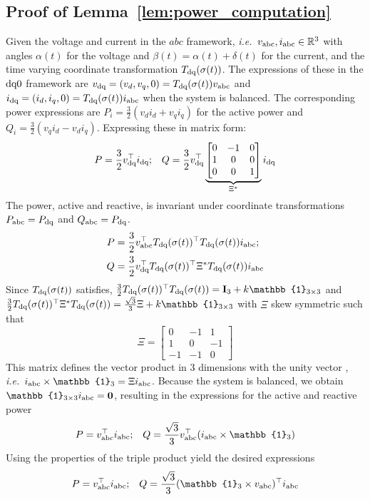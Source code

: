 \documentclass[journal, final, letterpaper]{IEEEtran}
\newcommand{\ts}[1]{{\textnormal{#1}}}
\newcommand{\ie}{\emph{i.e.}\ }
\newcommand{\Rset}{\mathbb{R}}
\newcommand{\mb}{\mathbf}
\newcommand{\mbb}{\mathbb}
\begin{document}
\subsection{Proof of Lemma~\ref{lem:power_computation}}
\label{sec:proof1}
%
%
Given the voltage and current in the $abc$ framework, \ie $v_\ts{abc},i_\ts{abc}\in\Rset^3$ with angles $\alpha(t)$ for the voltage and $\beta(t) = \alpha(t) + \delta(t)$ for the current, and the time varying coordinate transformation $T_\ts{dq}(\sigma(t))$. The expressions of these in the $\ts{dq0}$ framework are $v_\ts{dq} = (v_d,v_q,0) = T_\ts{dq}(\sigma(t))v_\ts{abc}$ and $i_\ts{dq} = (i_d,i_q,0)=T_\ts{dq}(\sigma(t))i_\ts{abc}$ when the system is balanced. The corresponding power expressions are $P_i = \frac{3}{2}(v_di_d + v_qi_q)$ for the active power and $Q_i = \frac{3}{2}(v_qi_d - v_di_q)$. Expressing these in matrix form:
%
\begin{align*}
	P = \frac{3}{2}v_\ts{dq}^\top i_\ts{dq}; && Q = \frac{3}{2}v_\ts{dq}^\top\underbrace{\begin{bmatrix}0 &-1 & 0\\1 & 0 & 0\\0& 0& 1\end{bmatrix}}_{\Xi^*} i_\ts{dq}
\end{align*}
%
The power, active and reactive, is invariant under coordinate transformations $P_\ts{abc} = P_\ts{dq}$ and $Q_\ts{abc} = P_\ts{dq}$. 
%
\begin{align*}
	P &= \frac{3}{2}v_\ts{abc}^\top T_\ts{dq}(\sigma(t))^\top T_\ts{dq}(\sigma(t)) i_\ts{abc};\\  
	Q &= \frac{3}{2}v_\ts{dq}^\top T_\ts{dq}(\sigma(t))^\top\Xi^*T_\ts{dq}(\sigma(t)) i_\ts{abc}
\end{align*}
%
Since $T_\ts{dq}(\sigma(t))$ satisfies, $\frac{3}{2}T_\ts{dq}(\sigma(t))^\top T_\ts{dq}(\sigma(t)) = \mb{I}_3 + k\mbb{1}_{3\times 3}$ and $\frac{3}{2}T_\ts{dq}(\sigma(t))^\top \Xi^*T_\ts{dq}(\sigma(t)) = \frac{\sqrt{3}}{3}\Xi + k\mbb{1}_{3\times 3}$ with $\Xi$ skew symmetric such that
%
\begin{equation*}
  \Xi = \begin{bmatrix} 0&-1 & 1\\ 1& 0& -1\\ -1 &-1 &0\end{bmatrix}
\end{equation*}
% 
This matrix defines the vector product in $3$ dimensions with the unity vector , \ie $i_\ts{abc}\times\mbb{1}_3 = \Xi i_\ts{abc}$. Because the system is balanced, we obtain $\mbb{1}_{3\times 3}i_\ts{abc} = \mb{0}$, resulting in the expressions for the active and reactive power
%
\begin{align*}
	P = v_\ts{abc}^\top i_\ts{abc}; && Q = \frac{\sqrt{3}}{3}v_\ts{abc}^\top(i_\ts{abc}\times\mbb{1}_{3})
\end{align*}
%
Using the properties of the triple product yield the desired expressions
\begin{align*}
	P = v_\ts{abc}^\top i_\ts{abc}; && Q = \frac{\sqrt{3}}{3} (\mbb{1}_{3} \times v_\ts{abc})^\top i_\ts{abc}
\end{align*}
%
\end{document}

